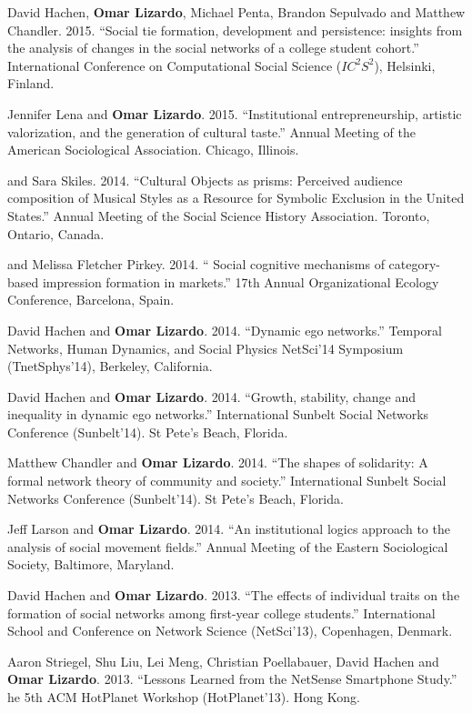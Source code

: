 
\ind David Hachen, {\bf Omar Lizardo}, Michael Penta, Brandon Sepulvado and Matthew Chandler. 2015. ``Social tie formation, development and persistence: insights from the analysis of changes in the social networks of a college student cohort.'' International Conference on Computational Social Science ($IC^2S^2$), Helsinki, Finland.

\ind Jennifer Lena and {\bf Omar Lizardo}. 2015. ``Institutional entrepreneurship, artistic valorization, and the generation of cultural taste.''  Annual Meeting of the American Sociological Association. Chicago, Illinois. 

 and Sara Skiles. 2014. ``Cultural Objects as prisms: Perceived audience composition of Musical Styles as a
Resource for Symbolic Exclusion in the United States.'' Annual Meeting of the Social Science History Association. Toronto, Ontario, Canada. 

 and Melissa Fletcher Pirkey. 2014. `` Social cognitive mechanisms of category-based impression formation in markets.'' 17th Annual Organizational Ecology Conference, Barcelona, Spain.

\ind David Hachen and {\bf Omar Lizardo}. 2014. ``Dynamic ego networks.'' Temporal Networks, Human Dynamics, and Social Physics NetSci'14 Symposium (TnetSphys'14), Berkeley, California. 

\ind David Hachen and {\bf Omar Lizardo}. 2014. ``Growth, stability, change and inequality in dynamic ego networks.''  International Sunbelt Social Networks Conference (Sunbelt'14). St Pete's Beach, Florida. 

\ind Matthew Chandler and {\bf Omar Lizardo}. 2014. ``The shapes of solidarity: A formal network theory of community and society.'' International Sunbelt Social Networks Conference (Sunbelt'14). St Pete's Beach, Florida. 

\ind Jeff Larson and  {\bf Omar Lizardo}. 2014. ``An institutional logics approach to the analysis of social movement fields.'' Annual Meeting of the Eastern Sociological Society, Baltimore, Maryland.

\ind David Hachen and {\bf Omar Lizardo}. 2013. ``The effects of individual traits on the formation of social networks among first-year college students.''  International School and Conference on Network Science (NetSci'13), Copenhagen, Denmark.

\ind Aaron Striegel, Shu Liu, Lei Meng, Christian Poellabauer, David Hachen and {\bf Omar Lizardo}. 2013. ``Lessons Learned from the NetSense Smartphone Study.'' he 5th ACM HotPlanet Workshop (HotPlanet'13). Hong Kong. 

